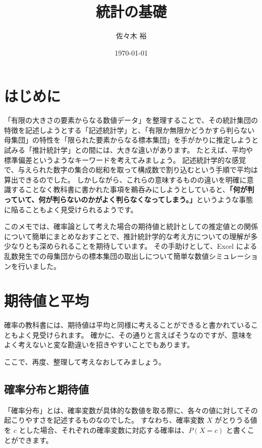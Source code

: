 \documentclass[uplatex,11pt,a4paper]{jsarticle}
\title{統計の基礎}
\author{佐々木 裕}
\date{\today}
\begin{document}
\maketitle

\tableofcontents

\newpage

\setcounter{secnumdepth}{4}


\section*{はじめに}

「有限の大きさの要素からなる数値データ」を整理することで、その統計集団の特徴を記述しようとする「記述統計学」と、「有限か無限かどうかすら判らない母集団」の特性を「限られた要素からなる標本集団」を手がかりに推定しようと試みる「推計統計学」との間には、大きな違いがあります。
たとえば、平均や標準偏差というようなキーワードを考えてみましょう。
記述統計学的な感覚で、与えられた数字の集合の総和を取って構成数で割り込むという手順で平均は算出できるのでした。
しかしながら、これらの意味するものの違いを明確に意識することなく教科書に書かれた事項を鵜呑みにしようとしていると、{\bf 「何が判っていて、何が判らないのかがよく判らなくなってしまう。」}というような事態に陥ることもよく見受けられるようです。

このメモでは、確率論として考えた場合の期待値と統計としての推定値との関係について簡単にまとめなおすことで、推計統計学的な考え方についての理解が多少なりとも深められることを期待しています。
その手助けとして、Excel による乱数発生での母集団からの標本集団の取出しについて簡単な数値シミュレーションを行いました。

\newpage

\section{期待値と平均}

確率の教科書には、期待値は平均と同様に考えることができると書かれていることもよく見受けられます。
確かに、その通りと言えばそうなのですが、意味をよく考えないと変な勘違いを招きやすいことでもあります。

ここで、再度、整理して考えなおしてみましょう。


\subsection{確率分布と期待値}


「確率分布」とは、確率変数が具体的な数値を取る際に、各々の値に対してその起こりやすさを記述するものなのでした。
すなわち、確率変数 $X$ がとりうる値を $c$ とした場合、それぞれの確率変数に対応する確率は、$P(X=c)$ と書くことができます。
\end{document}
